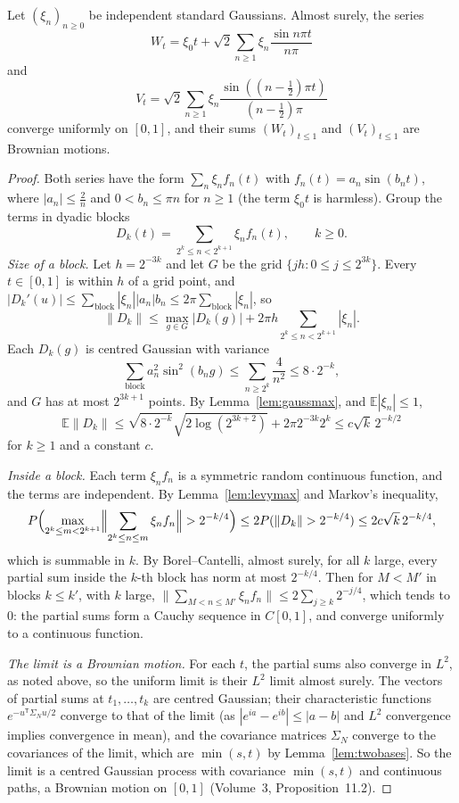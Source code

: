 \begin{theorem}\label{thm:wienerseries}
Let $(\xi_n)_{n\ge0}$ be independent standard Gaussians. Almost surely, the series
\[
W_t=\xi_0t+\sqrt2\sum_{n\ge1}\xi_n\frac{\sin n\pi t}{n\pi}
\]
and
\[
V_t=\sqrt2\sum_{n\ge1}\xi_n\frac{\sin((n-\frac12)\pi t)}{(n-\frac12)\pi}
\]
converge uniformly on $[0,1]$, and their sums $(W_t)_{t\le1}$ and $(V_t)_{t\le1}$ are Brownian motions.
\end{theorem}

\begin{proof}
Both series have the form $\sum_n\xi_nf_n(t)$ with $f_n(t)=a_n\sin(b_nt)$, where $|a_n|\le\frac2{n}$ and $0<b_n\le\pi n$ for $n\ge1$ (the term $\xi_0t$ is harmless). Group the terms in dyadic blocks
\[
D_k(t)=\sum_{2^k\le n<2^{k+1}}\xi_nf_n(t),\qquad k\ge0.
\]
\emph{Size of a block.} Let $h=2^{-3k}$ and let $G$ be the grid $\{jh:0\le j\le2^{3k}\}$. Every $t\in[0,1]$ is within $h$ of a grid point, and $|D_k'(u)|\le\sum_{\text{block}}|\xi_n||a_n|b_n\le2\pi\sum_{\text{block}}|\xi_n|$, so
\[
\|D_k\|\le\max_{g\in G}|D_k(g)|+2\pi h\sum_{2^k\le n<2^{k+1}}|\xi_n|.
\]
Each $D_k(g)$ is centred Gaussian with variance
\[\textstyle\sum_{\text{block}}a_n^2\sin^2(b_ng)\le\sum_{n\ge2^k}\frac4{n^2}\le8\cdot2^{-k},\]
and $G$ has at most $2^{3k+1}$ points. By Lemma~\ref{lem:gaussmax}, and $\mathbb E|\xi_n|\le1$,
\[
\mathbb E\|D_k\|\le\sqrt{8\cdot2^{-k}}\sqrt{2\log(2^{3k+2})}+2\pi2^{-3k}2^k\le c\sqrt k\,2^{-k/2}
\]
for $k\ge1$ and a constant $c$.

\emph{Inside a block.} Each term $\xi_nf_n$ is a symmetric random continuous function, and the terms are independent. By Lemma~\ref{lem:levymax} and Markov's inequality,
\[
P\Bigl(\max_{2^k\le m<2^{k+1}}\Bigl\|\sum_{2^k\le n\le m}\xi_nf_n\Bigr\|>2^{-k/4}\Bigr)\le2P(\|D_k\|>2^{-k/4})\le2c\sqrt k\,2^{-k/4},
\]
which is summable in $k$. By Borel--Cantelli, almost surely, for all $k$ large, every partial sum inside the $k$-th block has norm at most $2^{-k/4}$. Then for $M<M'$ in blocks $k\le k'$, with $k$ large,
$\bigl\|\sum_{M<n\le M'}\xi_nf_n\bigr\|\le2\sum_{j\ge k}2^{-j/4}$, which tends to $0$: the partial sums form a Cauchy sequence in $C[0,1]$, and converge uniformly to a continuous function.

\emph{The limit is a Brownian motion.} For each $t$, the partial sums also converge in $L^2$, as noted above, so the uniform limit is their $L^2$ limit almost surely. The vectors of partial sums at $t_1,\dots,t_k$ are centred
Gaussian; their characteristic functions $e^{-u^{\mathsf T}\Sigma_Nu/2}$ converge to that of the limit (as $|e^{ia}-e^{ib}|\le|a-b|$ and $L^2$ convergence implies convergence in mean), and the covariance matrices
$\Sigma_N$ converge to the covariances of the limit, which are $\min(s,t)$ by Lemma~\ref{lem:twobases}. So the limit is a centred Gaussian process with covariance $\min(s,t)$ and continuous paths, a Brownian motion
on $[0,1]$ (Volume~3, Proposition~11.2).
\end{proof}

